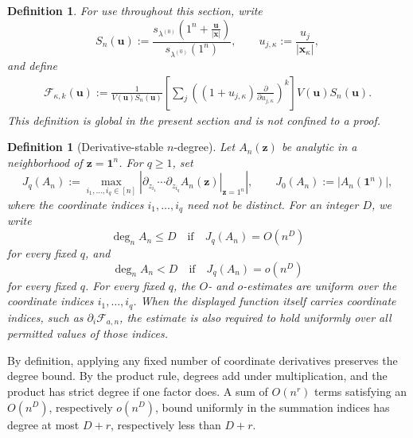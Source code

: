 \documentclass[11pt]{amsart}
\theoremstyle{plain}
\newtheorem{definition}[theorem]{Definition}
\numberwithin{equation}{section}
\numberwithin{theorem}{section}
\numberwithin{figure}{section}
\begin{document}
\begin{definition}\label{def:global-F}
For use throughout this section, write
\[
S_n(\mathbf u):=\frac{s_{\lambda^{(0)}}\left(1^n+\frac{\mathbf u}{|\mathbf x|}\right)}{s_{\lambda^{(0)}}(1^n)},
\qquad
u_{j,\kappa}:=\frac{u_j}{{|\mathbf x_\kappa|}},
\]
and define
\begin{align}
\mathcal F_{\kappa,k}(\mathbf u)
:=\frac{1}{V(\mathbf u)S_n(\mathbf u)}
\left[\sum_j\left((1+u_{j,\kappa})\frac{\partial}{\partial u_{j,\kappa}}\right)^k\right]
V(\mathbf u)S_n(\mathbf u).
\label{def:global-F-formula}
\end{align}
This definition is global in the present section and is not confined to a proof.
\end{definition}


\begingroup

\begin{definition}[Derivative-stable $n$-degree]
\label{def:derivative-stable-degree}
Let \(A_n(\mathbf z)\) be analytic in a neighborhood of
\(\mathbf z=\mathbf1^n\). For $q\geq1$, set
\[
    J_q(A_n)
    :=
    \max_{i_1,\ldots,i_q\in[n]}
    \left|
        \left.
        \partial_{z_{i_1}}\cdots\partial_{z_{i_q}}
        A_n(\mathbf z)
        \right|_{\mathbf z=1^n}
    \right|,
    \qquad
    J_0(A_n):=|A_n(\mathbf1^n)|,
\]
where the coordinate indices \(i_1,\ldots,i_q\) need not be distinct. For an integer $D$, we write
\[
    \deg_n A_n\leq D
    \quad\text{if}\quad
    J_q(A_n)=O(n^D)
\]
for every fixed $q$, and
\[
    \deg_n A_n<D
    \quad\text{if}\quad
    J_q(A_n)=o(n^D)
\]
for every fixed $q$. For every fixed \(q\), the \(O\)- and \(o\)-estimates are uniform over
the coordinate indices \(i_1,\ldots,i_q\). When the displayed function itself carries
coordinate indices, such as $\partial_i\mathcal F_{a,n}$, the estimate
is also required to hold uniformly over all permitted values of those
indices. 
\end{definition}

By definition, applying any fixed number of coordinate derivatives
preserves the degree bound. By the product
rule, degrees add under multiplication, and the product has strict
degree if one factor does. A sum of $O(n^r)$ terms satisfying an
$O(n^D)$, respectively $o(n^D)$, bound uniformly in the summation
indices has degree at most $D+r$, respectively less than $D+r$.
\endgroup

\begingroup
\end{document}

